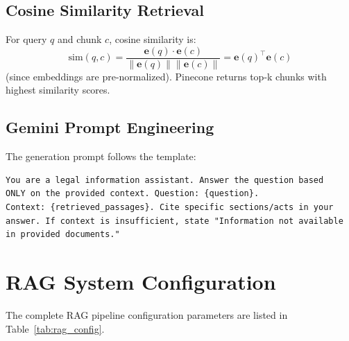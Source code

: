 \documentclass[12pt,a4paper]{report}
\begin{document}
\subsection{Cosine Similarity Retrieval}
For query $q$ and chunk $c$, cosine similarity is:
\begin{equation}
    \text{sim}(q, c) = \frac{\mathbf{e}(q) \cdot \mathbf{e}(c)}{\|\mathbf{e}(q)\| \|\mathbf{e}(c)\|} = \mathbf{e}(q)^\top \mathbf{e}(c)
\end{equation}
(since embeddings are pre-normalized). Pinecone returns top-k chunks with highest similarity scores.

\subsection{Gemini Prompt Engineering}
The generation prompt follows the template:
\begin{verbatim}
You are a legal information assistant. Answer the question based 
ONLY on the provided context. Question: {question}. 
Context: {retrieved_passages}. Cite specific sections/acts in your 
answer. If context is insufficient, state "Information not available 
in provided documents."
\end{verbatim}

\section{RAG System Configuration}
The complete RAG pipeline configuration parameters are listed in Table~\ref{tab:rag_config}.
\end{document}
